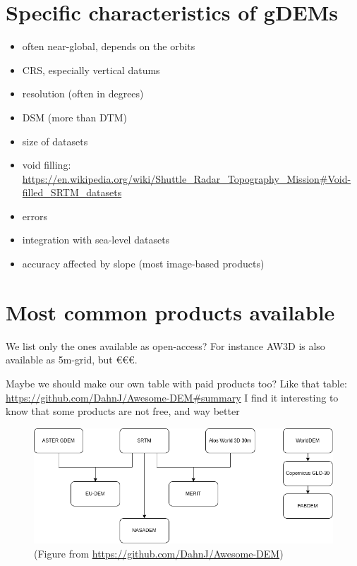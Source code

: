 %
\section[Specific characteristics]{Specific characteristics of gDEMs}

\begin{itemize}
  \item often near-global, depends on the orbits
  \item CRS, especially vertical datums
  \item resolution (often in degrees)
  \item DSM (more than DTM)
  \item size of datasets
  \item void filling: \url{https://en.wikipedia.org/wiki/Shuttle_Radar_Topography_Mission#Void-filled_SRTM_datasets}
  \item errors
  \item integration with sea-level datasets
  \item accuracy affected by slope (most image-based products)
\end{itemize}


%
\section[Most common products]{Most common products available}

We list only the ones available as open-access?
For instance AW3D is also available as 5m-grid, but €€€.

Maybe we should make our own table with paid products too? Like that table: \url{https://github.com/DahnJ/Awesome-DEM#summary}
I find it interesting to know that some products are not free, and way better

\begin{figure}
  \centering
  \includegraphics[width=\linewidth]{gdem_inheritance}
  \caption{(Figure from \url{https://github.com/DahnJ/Awesome-DEM})}%
\end{figure}


